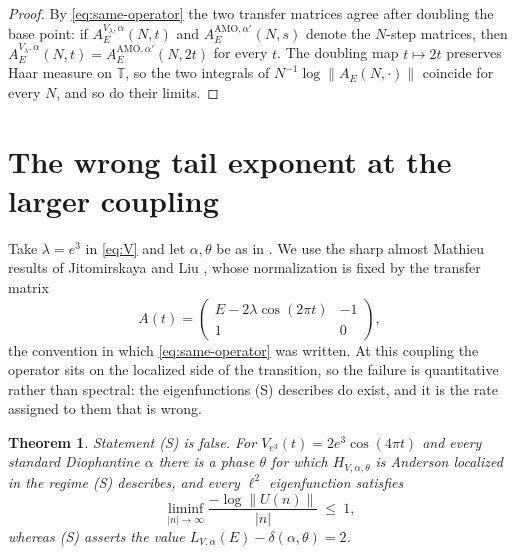 \documentclass[11pt,reqno]{amsart}
\theoremstyle{plain}
\newtheorem{theorem}{Theorem}[section]
\theoremstyle{definition}
\theoremstyle{remark}
\numberwithin{equation}{section}
\begin{document}
\begin{proof}
  By \eqref{eq:same-operator} the two transfer matrices agree after doubling
  the base point: if $A^{V_\lambda,\alpha}_E(N,t)$ and
  $A^{\mathrm{AMO},\alpha'}_E(N,s)$ denote the $N$-step matrices, then
  $A^{V_\lambda,\alpha}_E(N,t)=A^{\mathrm{AMO},\alpha'}_E(N,2t)$ for every
  $t$. The doubling map $t\mapsto2t$ preserves Haar measure on $\mathbb T$,
  so the two integrals of $N^{-1}\log\lVert A_E(N,\cdot)\rVert$ coincide for
  every $N$, and so do their limits.
\end{proof}

\section{The wrong tail exponent at the larger coupling}
\label{sec:asymptotics}

Take $\lambda=e^{3}$ in \eqref{eq:V} and let $\alpha,\theta$ be as in
. We use the sharp almost Mathieu results of
Jitomirskaya and Liu \cite{Jitomirskaya_2024ur}, whose normalization is fixed
by the transfer matrix
\begin{equation}
  \label{eq:amo-normalization}
  A(t)=
  \begin{pmatrix}
    E-2\lambda\cos(2\pi t) & -1\\
    1 & 0
  \end{pmatrix},
\end{equation}
the convention in which \eqref{eq:same-operator} was written. At this
coupling the operator sits on the localized side of the transition, so the
failure is quantitative rather than spectral: the eigenfunctions (S)
describes do exist, and it is the rate assigned to them that is wrong.

\begin{theorem}
  \label{thm:main}
  Statement (S) is false. For $V_{e^{3}}(t)=2e^{3}\cos(4\pi t)$ and every
  standard Diophantine $\alpha$ there is a phase $\theta$ for which
  $H_{V,\alpha,\theta}$ is Anderson localized in the regime (S) describes,
  and every $\ell^2$ eigenfunction satisfies
  \begin{equation*}
    \liminf_{|n|\to\infty}\frac{-\log\lVert U(n)\rVert}{|n|}\ \le\ 1,
  \end{equation*}
  whereas (S) asserts the value
  $L_{V,\alpha}(E)-\delta(\alpha,\theta)=2$.
\end{theorem}
\end{document}
